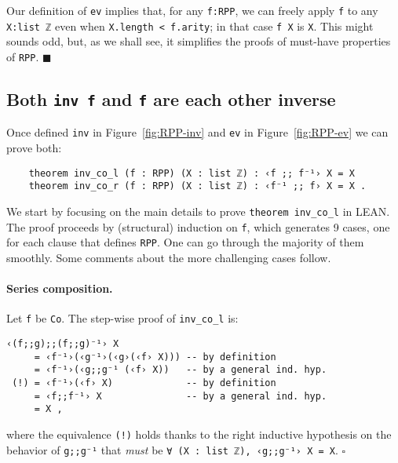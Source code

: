\documentclass[runningheads]{llncs}
\newcommand*{\qeda}{\hfill\ensuremath{\blacksquare}}%
\newcommand*{\qedb}{\hfill\ensuremath{\square}}%
\newcommand{\LEAN}{\textsf{LEAN}\xspace}
\begin{document}
\begin{remark}
\label{remark:We keep the definition of ev simple}
Our definition of \lstinline|ev| implies that, for any \lstinline|f:RPP|, we can freely apply \lstinline|f| to any \lstinline|X:list ℤ| even when \lstinline|X.length < f.arity|; in that case \lstinline|f X| is \lstinline|X|.
This might sounds odd, but, as we shall see, it simplifies the proofs of must-have properties of \lstinline|RPP|.
\qeda
\end{remark}

\subsection{Both {\normalfont \lstinline|inv f|} and {\normalfont \lstinline|f|} are each other inverse}
Once defined \lstinline|inv| in Figure~\ref{fig:RPP-inv} and \lstinline|ev| in Figure~\ref{fig:RPP-ev} we can prove both:
\begin{lstlisting}
    theorem inv_co_l (f : RPP) (X : list ℤ) : ‹f ;; f⁻¹› X = X
    theorem inv_co_r (f : RPP) (X : list ℤ) : ‹f⁻¹ ;; f› X = X .
\end{lstlisting}
We start by focusing on the main details to prove \lstinline|theorem inv_co_l| in \LEAN. The proof proceeds by (structural) induction on \lstinline|f|, which generates 9 cases, one for each clause that defines \lstinline|RPP|. One can go through the majority of them smoothly.
Some comments about the more challenging cases follow.

\paragraph{Series composition.} Let \lstinline|f| be \lstinline|Co|. The step-wise proof of \lstinline|inv_co_l| is:
\begin{lstlisting}
‹(f;;g);;(f;;g)⁻¹› X
     = ‹f⁻¹›(‹g⁻¹›(‹g›(‹f› X))) -- by definition
     = ‹f⁻¹›(‹g;;g⁻¹ (‹f› X))   -- by a general ind. hyp.
 (!) = ‹f⁻¹›(‹f› X)             -- by definition
     = ‹f;;f⁻¹› X               -- by a general ind. hyp.
     = X ,
\end{lstlisting}
where the equivalence \lstinline|(!)| holds thanks to the right inductive hypothesis on the behavior of \lstinline|g;;g⁻¹| that \emph{must} be
\lstinline|∀ (X : list ℤ), ‹g;;g⁻¹› X = X|.
\qedb
\end{document}
